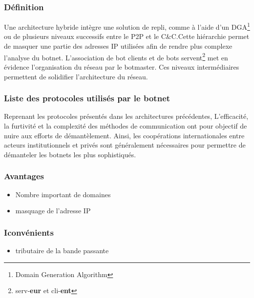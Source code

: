 
\subsubsection{Définition}
Une architecture hybride intègre une solution de repli, comme à l'aide d'un DGA\footnote{Domain Generation Algorithm} ou de plusieurs niveaux successifs entre le P2P et le C\&C.Cette hiérarchie permet de masquer une partie des adresses IP utilisées afin de rendre plus complexe l'analyse du botnet.
L'association de bot clients et de bots servent\footnote{serv-\textbf{eur} et cli-\textbf{ent}} met en évidence l'organisation du réseau par le botmaster.
Ces niveaux intermédiaires permettent de solidifier l'architecture du réseau.

\subsubsection{Liste des protocoles utilisés par le botnet}
Reprenant les protocoles présentés dans les architectures précédentes, L'efficacité, la furtivité et la complexité des méthodes de communication ont pour objectif de nuire aux efforts de démantèlement.
Ainsi, les coopérations internationales entre acteurs institutionnels et
privés sont généralement nécessaires pour permettre de démanteler les botnets les plus sophistiqués.

\subsubsection{Avantages}
\begin{itemize}
	\item Nombre important de domaines
  \item masquage de l'adresse IP
\end{itemize}

\subsubsection{Iconvénients}
\begin{itemize}
	\item tributaire de la bande passante
\end{itemize}

